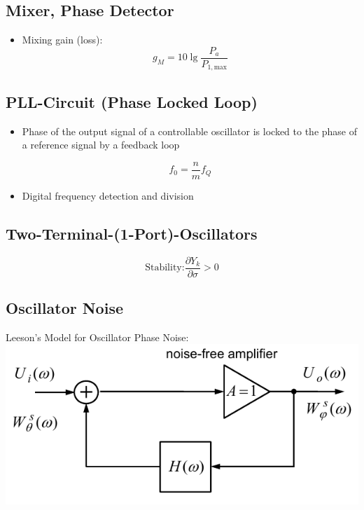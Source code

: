 \subsection{Mixer, Phase Detector}
\begin{itemize}
    \item Mixing gain (loss):
        \begin{equation*}
            g_M = 10 \lg\dfrac{P_a}{P_{1,\mathrm{max}}}
        \end{equation*}
\end{itemize}
\subsection{PLL-Circuit (Phase Locked Loop)}
\begin{itemize}
    \itemsep0pt
    \item Phase of the output signal of a controllable oscillator is locked to the phase of a reference signal by a feedback loop
    
    \begin{equation*}
        f_0 = \dfrac{n}{m} f_Q
    \end{equation*}
    \item Digital frequency detection and division
\end{itemize}
\subsection{Two-Terminal-(1-Port)-Oscillators}
\begin{equation*}
    \text{Stability:} \dfrac{\partial Y_k}{\partial\sigma} > 0
\end{equation*}
\subsection{Oscillator Noise}
Leeson's Model for Oscillator Phase Noise:\\
\includegraphics[width=.3\paperheight]{content/hfcomp/pictures/leeson_model_phase_noise.png}
